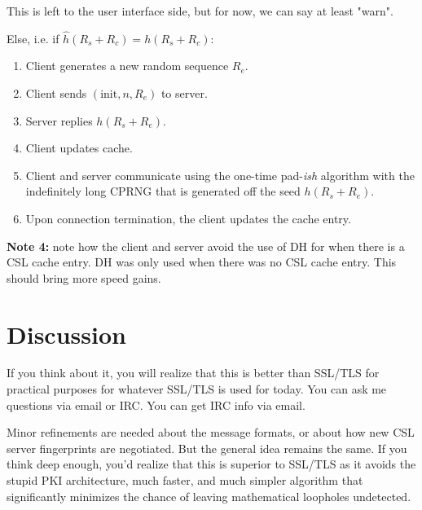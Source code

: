 \documentclass{article}
\begin{document}
\begin{enumerate}
\begin{enumerate}
\begin{enumerate}
                This is left to the user interface side, but for now, we can
                say at least "warn".
            \end{enumerate}
        Else, i.e. if $\hat h(R_s + R_c) = h(R_s + R_c)$:
            \begin{enumerate}
                \item Client generates a new random sequence $R_e$.
                \item Client sends $(\text{init}, n, R_e)$ to server.
                \item Server replies $h(R_s + R_e)$.
                \item Client updates cache.
                \item Client and server communicate using the one-time
                pad-\emph{ish} algorithm with the indefinitely long CPRNG that
                is generated off the seed $h(R_s+R_e)$.
                \item Upon connection termination, the client updates the cache
                entry.
            \end{enumerate}
        \textbf{Note 4:} note how the client and server avoid the use of DH for
        when there is a CSL cache entry. DH was only used when there was no CSL
        cache entry. This should bring more speed gains.

    \end{enumerate}
\end{enumerate}

\section{Discussion}
If you think about it, you will realize that this is better than SSL/TLS for
practical purposes for whatever SSL/TLS is used for today. You can ask me
questions via email or IRC. You can get IRC info via email.

Minor refinements are needed about the message formats, or
about how new CSL server fingerprints are negotiated. But the general idea
remains the same. If you think deep enough, you'd realize that this is superior
to SSL/TLS as it avoids the stupid PKI architecture, much faster, and much
simpler algorithm that significantly minimizes the chance of leaving
mathematical loopholes undetected.
\end{document}
